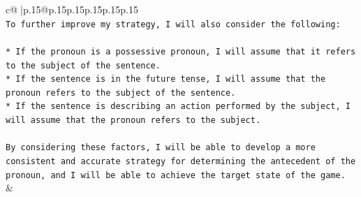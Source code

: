 \documentclass{article}
\begin{document}
{\begin{supertabular}{c@{$\;$}|p{.15\linewidth}@{}p{.15\linewidth}p{.15\linewidth}p{.15\linewidth}p{.15\linewidth}p{.15\linewidth}}
{{{\\ 
\texttt{To further improve my strategy, I will also consider the following:} \\
\\ 
\texttt{* If the pronoun is a possessive pronoun, I will assume that it refers to the subject of the sentence.} \\
\texttt{* If the sentence is in the future tense, I will assume that the pronoun refers to the subject of the sentence.} \\
\texttt{* If the sentence is describing an action performed by the subject, I will assume that the pronoun refers to the subject.} \\
\\ 
\texttt{By considering these factors, I will be able to develop a more consistent and accurate strategy for determining the antecedent of the pronoun, and I will be able to achieve the target state of the game.} \\
            }
        }
    }
    & \\ \\

\end{supertabular}
}
\end{document}
